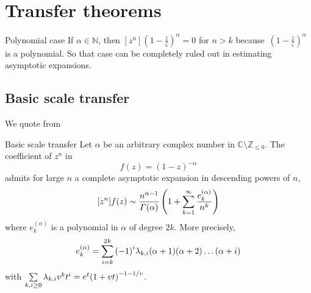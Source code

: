 \documentclass[../main.tex]{subfiles}
\begin{document}
\section{Transfer theorems}


%	
%	

\begin{thm}{Polynomial case}
	If $\alpha \in \mathbb{N}$, then $[z^n]{\left(1 - \frac{z}{\zeta}\right)}^\alpha = 0$ for $n > k$
	because~${\left(1 - \frac{z}{\zeta}\right)}^\alpha$ is a polynomial. So that case can be completely ruled out in estimating asymptotic expansions.
\end{thm}


\subsection{Basic scale transfer}

We quote from \cite{Flajolet2009}

\begin{thm}{Basic scale transfer}
	Let $\alpha$ be an arbitrary complex number in
	$\mathbb{C} \setminus \mathbb{Z}_{\leq 0}$.
	The coefficient of $z^n$ in
	\[
	f(z) = {(1 - z)}^{-\alpha}
	\]
	admits for large $n$ a complete asymptotic expansion in descending powers of $n$,
	\[
	[z^n]f(z) \sim \frac{n^{\alpha - 1}}{\Gamma(\alpha)}
	\left(1 + \sum\limits_{k = 1}^{\infty} \frac{e_k^{(\alpha)}}{n^k} \right)
	\]
	where $e_k^{(\alpha)}$ is a polynomial in $\alpha$ of degree $2k$.
	More precisely,
	\[
	e_k^{(\alpha)} = \sum\limits_{i = k}^{2k} {(-1)}^i \lambda_{k, i} (\alpha + 1) (\alpha + 2) \dots (\alpha + i)
	\]
	with $\sum\limits_{k, i \geq 0} \lambda_{k, i} v^k t^i = e^t {(1 + vt)}^{-1 - 1/v}$.
\end{thm}
\end{document}
